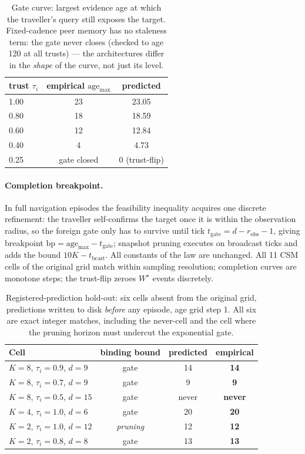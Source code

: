 \documentclass{article}
\newcommand{\wstar}{W^{\star}}
\begin{document}
\begin{table}[h]
\centering
\caption{Gate curve: largest evidence age at which the traveller's
query still exposes the target. Fixed-cadence peer memory has no
staleness term: the gate never closes (checked to age 120 at all
trusts) --- the architectures differ in the \emph{shape} of the curve,
not just its level.}
\label{p2:tab:gate}
\small
\begin{tabular}{lcc}
\toprule
trust $\tau_i$ & empirical $\mathrm{age}_{\max}$ & predicted \\
\midrule
1.00 & 23 & 23.05 \\
0.80 & 18 & 18.59 \\
0.60 & 12 & 12.84 \\
0.40 & 4  & 4.73 \\
0.25 & gate closed & 0 (trust-flip) \\
\bottomrule
\end{tabular}
\end{table}

\paragraph{Completion breakpoint.} In full navigation episodes the
feasibility inequality acquires one discrete refinement: the traveller
self-confirms the target once it is within the observation radius, so
the foreign gate only has to survive until tick $t_{\text{gate}} = d -
r_{\text{obs}} - 1$, giving breakpoint $\mathrm{bp} =
\mathrm{age}_{\max} - t_{\text{gate}}$; snapshot pruning executes on
broadcast ticks and adds the bound $10K - t_{\text{bcast}}$. All
constants of the law are unchanged. All 11 CSM cells of the original
grid match within sampling resolution; completion curves are monotone
steps; the trust-flip zeroes $\wstar$ events discretely.

\begin{table}[h]
\centering
\caption{Registered-prediction hold-out: six cells absent from the
original grid, predictions written to disk \emph{before} any episode,
age grid step 1. All six are exact integer matches, including the
never-cell and the cell where the pruning horizon must undercut the
exponential gate.}
\label{p2:tab:holdout}
\small
\begin{tabular}{lccc}
\toprule
Cell & binding bound & predicted & empirical \\
\midrule
$K{=}8$, $\tau_i{=}0.9$, $d{=}9$  & gate    & 14 & \textbf{14} \\
$K{=}8$, $\tau_i{=}0.7$, $d{=}9$  & gate    & 9  & \textbf{9}  \\
$K{=}8$, $\tau_i{=}0.5$, $d{=}15$ & gate    & never & \textbf{never} \\
$K{=}4$, $\tau_i{=}1.0$, $d{=}6$  & gate    & 20 & \textbf{20} \\
$K{=}2$, $\tau_i{=}1.0$, $d{=}12$ & \emph{pruning} & 12 & \textbf{12} \\
$K{=}2$, $\tau_i{=}0.8$, $d{=}8$  & gate    & 13 & \textbf{13} \\
\bottomrule
\end{tabular}
\end{table}
\end{document}
